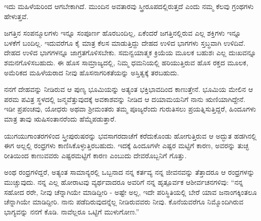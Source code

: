 ಇದು ಮಹಿಳೆಯರಿಂದ ಆಗಬೇಕಾಗಿದೆ. ಮುಂದಿನ ಅವತಾರವು ಸ್ತ್ರೀರೂಪದಲ್ಲಿರುತ್ತದೆ ಎಂದು ನಮ್ಮ ಕೆಲವು ಗ್ರಂಥಗಳು ಹೇಳುತ್ತವೆ.

ಜಗತ್ತಿನ ಸಂಪನ್ಮೂಲಗಳು ಇನ್ನೂ ಸಂಪೂರ್ಣ ಹೊರಬಂದಿಲ್ಲ, ಏಕೆಂದರೆ ಜಗತ್ತಿನಲ್ಲಿರುವ ಎಲ್ಲ ಶಕ್ತಿಗಳು ಇನ್ನೂ ಬಳಕೆಗೆ ಬಂದಿಲ್ಲ. ಇದುವರೆಗೂ ಕೈ ಮಾತ್ರ ಕೆಲಸ ಮಾಡುತ್ತಿದ್ದು ದೇಹದ ಉಳಿದ ಭಾಗಗಳು ಸ್ತಬ್ಧವಾಗಿ ಉಳಿದಿವೆ. ದೇಹದ ಉಳಿದ ಭಾಗಗಳನ್ನೂ ಜಾಗ್ರತಗೊಳಿಸಬೇಕು. ಸಮನ್ವಯಾತ್ಮಕ ಕ್ರಿಯೆಯ ಮೂಲಕ ಬಹುಶಃ ಎಲ್ಲ ದುಃಖವನ್ನೂ ಶಮನಗೊಳಿಸಬಹುದು. ಈ ಹೊಸ ಸಾಮ್ರಾಜ್ಯದಲ್ಲಿ, ನಿಮ್ಮ ಧಮನಿಯಲ್ಲಿ ಹರಿಯುತ್ತಿರುವ ಹೊಸ ರಕ್ತದ ಮೂಲಕ, ಅಮೆರಿಕದ ಮಹಿಳೆಯರಾದ ನೀವು ಹೊಸನಾಗರಿಕತೆಯನ್ನು ಅಸ್ತಿತ್ವಕ್ಕೆ ತರಬಹುದು.

ನನಗೆ ದೇಹವನ್ನು ನೀಡಿರುವ ಆ ಪುಣ್ಯ ಭೂಮಿಯನ್ನು ಅತ್ಯಂತ ಭಕ್ತಿಭಾವದಿಂದ ಕಾಣುತ್ತೇನೆ. ಭೂಮಿಯ ಮೇಲಿನ ಆ ಪರಮ ಪವಿತ್ರ ಸ್ಥಳದಲ್ಲಿ ಜನ್ಮವೆತ್ತುವುದಕ್ಕೆ ಅವಕಾಶವನ್ನು ನೀಡಿದ ಆ ದಯಾಮಯನಿಗೆ ನಾನು ಋಣಿಯಾಗಿದ್ದೇನೆ. ಇಡೀ ಪ್ರಪಂಚವು, ಯೋಧರು ಅಥವಾ ಶ‍್ರೀಮಂತರು ತಮ್ಮ ಪೂಜ್ಯರೆಂದು ಗುರುತಿಸಲು ಪ್ರಯತ್ನಿಸುತ್ತಿದ್ದರೆ, ಹಿಂದೂಗಳು ಮಾತ್ರ ತಾವು ಋಷಿಸಂತಾನರೆಂದು ಹೆಮ್ಮೆಪಡುತ್ತಾರೆ.

ಯುಗಯುಗಾಂತರಗಳಿಂದ ಸ್ತ್ರೀಪುರುಷರನ್ನು ಭವಸಾಗರದಾಚೆಗೆ ಕರೆದುಕೊಂಡು ಹೋಗುತ್ತಿರುವ ಆ ಅದ್ಭುತ ಹಡಗಿನಲ್ಲಿ ಈಗ ಅಲ್ಲಲ್ಲಿ ರಂಧ್ರಗಳು ಕಾಣಿಸಿಕೊಳ್ಳುತ್ತಿರಬಹುದು. ಇದಕ್ಕೆ ಹಿಂದೂಗಳೇ ಎಷ್ಟರ ಮಟ್ಟಿಗೆ ಕಾರಣ, ಅವರನ್ನು ತುಚ್ಛ ರೀತಿಯಿಂದ ಕಾಣುವವರು ಎಷ್ಟರಮಟ್ಟಿಗೆ ಕಾರಣ ಎಂಬುದು ದೇವರೊಬ್ಬನಿಗೆ ಗೊತ್ತು.

ಅಂಥ ರಂಧ್ರಗಳಿದ್ದರೆ, ಅತ್ಯಂತ ಸಾಮಾನ್ಯರಲ್ಲಿ ಒಬ್ಬನಾದ ನನ್ನ ಕರ್ತವ್ಯ ನನ್ನ ಜೀವನವನ್ನು ತೆತ್ತಾದರೂ ಆ ರಂಧ್ರಗಳನ್ನು ಮುಚ್ಚುವುದು. ನನ್ನ ಎಲ್ಲ ಹೋರಾಟವು ವ್ಯರ್ಥವಾದರೂ ಅವರಿಗೆ ನನ್ನ ಹೃತ್ಪೂರ್ವಕ ಆಶೀರ್ವಚನಗಳಿವು: “ನನ್ನ ಸಹೋದ ರರೇ, ನೀವು ಚೆನ್ನಾಗಿಯೇ ಮಾಡಿದ್ದೀರಿ - ಅಷ್ಟೇ ಅಲ್ಲ, ಇದೇ ಪರಿಸ್ಥಿತಿಯಲ್ಲಿ ಬೇರೆ ಯಾವ ಜನಾಂಗಕ್ಕಿಂತಲೂ ಚೆನ್ನಾಗಿಯೇ ಮಾಡಿದ್ದೀರಿ. ನಾನು ಪಡೆದಿರುವುದನ್ನೆಲ್ಲ ನೀಡಿರುವವರು ನೀವು. ಕೊನೆಯವರೆಗೂ ನಿಮ್ಮೊಂದಿಗಿರುವ ಭಾಗ್ಯವನ್ನು ನನಗೆ ಕೊಡಿ. ನಾವೆಲ್ಲರೂ ಒಟ್ಟಿಗೆ ಮುಳುಗೋಣ.”

